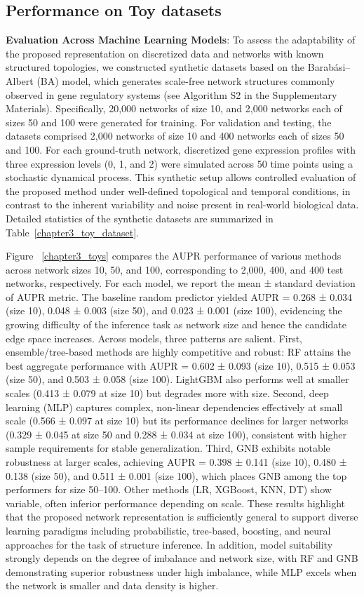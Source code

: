 \subsection{Performance on Toy datasets}
\textbf{Evaluation Across Machine Learning Models}: To assess the adaptability of the proposed representation on discretized data and networks with known structured topologies, we constructed synthetic datasets based on the Barabási–Albert (BA) model, which generates scale-free network structures commonly observed in gene regulatory systems (see Algorithm S2 in the Supplementary Materials). Specifically, 20,000 networks of size 10, and 2,000 networks each of sizes 50 and 100 were generated for training. For validation and testing, the datasets comprised 2,000 networks of size 10 and 400 networks each of sizes 50 and 100. For each ground-truth network, discretized gene expression profiles with three expression levels (0, 1, and 2) were simulated across 50 time points using a stochastic dynamical process. This synthetic setup allows controlled evaluation of the proposed method under well-defined topological and temporal conditions, in contrast to the inherent variability and noise present in real-world biological data.
Detailed statistics of the synthetic datasets are summarized in Table~\ref {chapter3_toy_dataset}.\par
Figure ~\ref{chapter3_toys} compares the AUPR performance of various methods across network sizes 10, 50, and 100, corresponding to 2,000, 400, and 400 test networks, respectively. For each model, we report the mean ± standard deviation of AUPR metric. The baseline random predictor yielded AUPR = 0.268 ± 0.034 (size 10), 0.048 ± 0.003 (size 50), and 0.023 ± 0.001 (size 100), evidencing the growing difficulty of the inference task as network size and hence the candidate edge space increases. Across models, three patterns are salient. First, ensemble/tree-based methods are highly competitive and robust: RF attains the best aggregate performance with AUPR = 0.602 ± 0.093 (size 10), 0.515 ± 0.053 (size 50), and 0.503 ± 0.058 (size 100). LightGBM also performs well at smaller scales (0.413 ± 0.079 at size 10) but degrades more with size. Second, deep learning (MLP) captures complex, non-linear dependencies effectively at small scale (0.566 ± 0.097 at size 10) but its performance declines for larger networks (0.329 ± 0.045 at size 50 and 0.288 ± 0.034 at size 100), consistent with higher sample requirements for stable generalization. Third, GNB exhibits notable robustness at larger scales, achieving AUPR = 0.398 ± 0.141 (size 10), 0.480 ± 0.138 (size 50), and 0.511 ± 0.001 (size 100), which places GNB among the top performers for size 50–100. Other methods (LR, XGBoost, KNN, DT) show variable, often inferior performance depending on scale. These results highlight that the proposed network representation is sufficiently general to support diverse learning paradigms including probabilistic, tree-based, boosting, and neural approaches for the task of structure inference. In addition, model suitability strongly depends on the degree of imbalance and network size, with RF and GNB demonstrating superior robustness under high imbalance, while MLP excels when the network is smaller and data density is higher.

